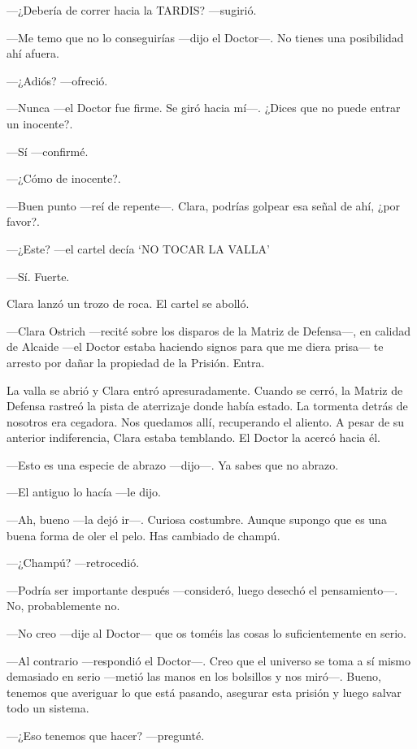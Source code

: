 ---¿Debería de correr hacia la TARDIS? ---sugirió.

---Me temo que no lo conseguirías ---dijo el Doctor---. No tienes una
posibilidad ahí afuera.

---¿Adiós? ---ofreció.

---Nunca ---el Doctor fue firme. Se giró hacia mí---. ¿Dices que no
puede entrar un inocente?.

---Sí ---confirmé.

---¿Cómo de inocente?.

---Buen punto ---reí de repente---. Clara, podrías golpear esa señal de
ahí, ¿por favor?.

---¿Este? ---el cartel decía `NO TOCAR LA VALLA'

---Sí. Fuerte.

Clara lanzó un trozo de roca. El cartel se abolló.

---Clara Ostrich ---recité sobre los disparos de la Matriz de
Defensa---, en calidad de Alcaide ---el Doctor estaba haciendo signos
para que me diera prisa--- te arresto por dañar la propiedad de la
Prisión. Entra.

La valla se abrió y Clara entró apresuradamente. Cuando se cerró, la
Matriz de Defensa rastreó la pista de aterrizaje donde había estado. La
tormenta detrás de nosotros era cegadora. Nos quedamos allí, recuperando
el aliento. A pesar de su anterior indiferencia, Clara estaba temblando.
El Doctor la acercó hacia él.

---Esto es una especie de abrazo ---dijo---. Ya sabes que no abrazo.

---El antiguo lo hacía ---le dijo.

---Ah, bueno ---la dejó ir---. Curiosa costumbre. Aunque supongo que es
una buena forma de oler el pelo. Has cambiado de champú.

---¿Champú? ---retrocedió.

---Podría ser importante después ---consideró, luego desechó el
pensamiento---. No, probablemente no.

---No creo ---dije al Doctor--- que os toméis las cosas lo
suficientemente en serio.

---Al contrario ---respondió el Doctor---. Creo que el universo se toma
a sí mismo demasiado en serio ---metió las manos en los bolsillos y nos
miró---. Bueno, tenemos que averiguar lo que está pasando, asegurar esta
prisión y luego salvar todo un sistema.

---¿Eso tenemos que hacer? ---pregunté.

